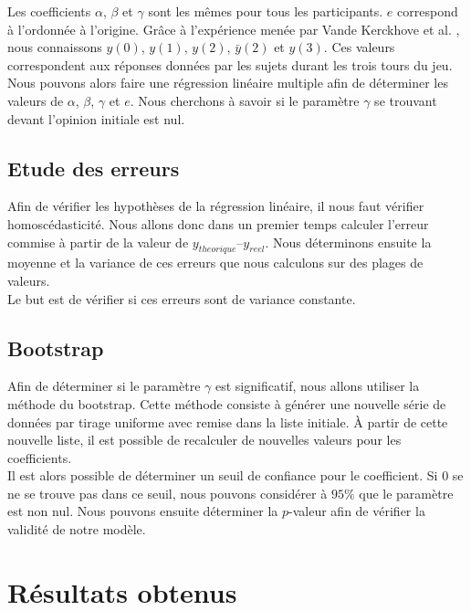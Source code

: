 \documentclass{scrreprt}
\begin{document}
Les coefficients $\alpha$, $\beta$ et $\gamma$ sont les mêmes pour tous les participants. $e$ correspond à l'ordonnée à l'origine.
Grâce à l’expérience menée par Vande Kerckhove et al. \cite{VMG}, nous connaissons $y(0)$, $y(1)$, $y(2)$, $\bar{y}(2)$ et $y(3)$. Ces valeurs correspondent aux réponses données par les sujets durant les trois tours du jeu. Nous pouvons alors faire une régression linéaire multiple afin de déterminer les valeurs de $\alpha$, $\beta$, $\gamma$ et $e$. Nous cherchons à savoir si le paramètre $\gamma$ se trouvant devant l'opinion initiale est nul.\\

\section{Etude des erreurs}

Afin de vérifier les hypothèses de la régression linéaire, il nous faut vérifier homoscédasticité. Nous allons donc dans un premier temps calculer l’erreur commise à partir de la valeur de $y_{theorique} – y_{reel}$. Nous déterminons ensuite la moyenne et la variance de ces erreurs que nous calculons sur des plages de valeurs.\\

Le but est de vérifier si ces erreurs sont de variance constante.\\

\section{Bootstrap}

Afin de déterminer si le paramètre $\gamma$ est significatif, nous allons utiliser la méthode du bootstrap. Cette méthode consiste à générer une nouvelle série de données par tirage uniforme avec remise dans la liste initiale. À partir de cette nouvelle liste, il est possible de recalculer de nouvelles valeurs pour les coefficients.\\

Il est alors possible de déterminer un seuil de confiance pour le coefficient. Si $0$ se ne se trouve pas dans ce seuil, nous pouvons considérer à $95\%$ que le paramètre est non nul. 
Nous pouvons ensuite déterminer la $p$-valeur afin de vérifier la validité de notre modèle.

\chapter{Résultats obtenus}
\end{document}
